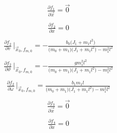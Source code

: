 \documentclass[12pt,a4paper,oneside]{book}
\begin{document}
\begin{onehalfspace}
{\begin{equation*}
\end{equation*} }
\begin{equation}\label{pendulum_on_cart_14}
	\begin{aligned}
		\frac{\partial f_1}{\partial \vec{x}}=\vec{0}\\[6pt]
	\end{aligned}
\end{equation}
\begin{equation}\label{pendulum_on_cart_15}
	\begin{aligned}
		\frac{\partial f_2}{\partial x}=0\\[6pt]
	\end{aligned}
\end{equation}
\begin{equation}\label{pendulum_on_cart_16}
	\begin{aligned}
		\frac{\partial f_2}{\partial v}\,\Big|_{\vec{x}_0,f_{m,0}}=-\frac{b_0\big(J_1+m_1l^2\big)}{\big(m_0+m_1\big)\big(J_1+m_1l^2\big)-m_1^2l^2}\\[6pt]
	\end{aligned}
\end{equation}
\begin{equation}\label{pendulum_on_cart_17}
	\begin{aligned}
		\frac{\partial f_2}{\partial \vartheta}\,\Big|_{\vec{x}_0,f_{m,0}}=-\frac{gm_1^2l^2}{\big(m_0+m_1\big)\big(J_1+m_1l^2\big)-m_1^2l^2}\\[6pt]
	\end{aligned}
\end{equation}
\begin{equation}\label{pendulum_on_cart_18}
	\begin{aligned}
		\frac{\partial f_2}{\partial \omega}\,\Big|_{\vec{x}_0,f_{m,0}}=\frac{b_1m_1l}{\big(m_0+m_1\big)\big(J_1+m_1l^2\big)-m_1^2l^2}\\[6pt]
	\end{aligned}
\end{equation}
\begin{equation}\label{pendulum_on_cart_19}
	\begin{aligned}
		\frac{\partial f_3}{\partial \vec{x}}=\vec{0}\\[6pt]
	\end{aligned}
\end{equation}
\begin{equation}\label{pendulum_on_cart_20}
	\begin{aligned}
		\frac{\partial f_4}{\partial x}=0\\[6pt]

\end{aligned}
\end{equation}
\end{onehalfspace}
\end{document}
